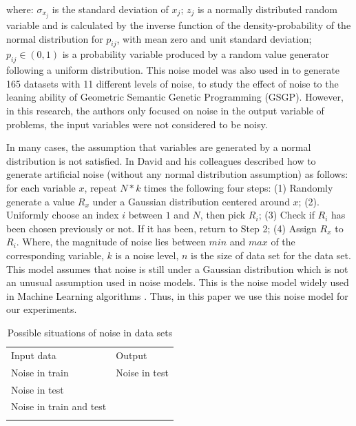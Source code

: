 where: $\sigma_{x_{j}}$ is the standard deviation of $x_{j}$; $z_{j}$ is a  normally distributed random variable and is calculated by the inverse function of the density-probability of the normal distribution for $p_{ij}$, with mean zero and unit standard deviation; $p_{ij} \in (0, 1)$ is a probability variable produced by a random value generator following a uniform distribution. This noise model was also used in \cite{miranda2017noisy} to generate 165 datasets with 11 different levels of noise, to study the effect of noise to the leaning ability of Geometric Semantic Genetic Programming (GSGP). However, in this research, the authors only focused on noise in the output variable of problems, the input variables were not considered to be noisy.

In many cases, the assumption that variables are generated by a normal distribution is not satisfied. In \cite{2010Dav} David and his colleagues described how to generate artificial noise (without any normal distribution assumption) as follows: for each variable $x$, repeat $N*k$ times the following four steps: (1) Randomly generate a value $R_{x}$ under a Gaussian distribution centered around $x$; (2). Uniformly choose an index $i$ between $1$ and $N$, then pick $R_{i}$; (3) Check if $R_{i}$ has been chosen previously or not. If it has been, return to Step 2; (4) Assign $R_{x}$ to $R_{i}$. Where, the magnitude of noise lies between $min$ and $max$ of the corresponding variable, $k$ is a noise level, $n$ is the size of data set for the data set. This model assumes that noise is still under a Gaussian distribution which is not an unusual assumption used in noise models. This is the noise model widely used in Machine Learning algorithms \cite{2010Dav}. Thus, in this paper we use this noise model for our experiments.

\par
\begin{table}
\caption{Possible situations of noise in data sets}
\label{tab:CaseOfNoise}       %
\begin{tabular}{ll}
\hline\noalign{\smallskip}
Input data & Output \\
\noalign{\smallskip}\hline\noalign{\smallskip}
Noise in train & Noise in test \\
Noise in test & \\
Noise in train and test & \\
\noalign{\smallskip}\hline
\end{tabular}
\end{table}


